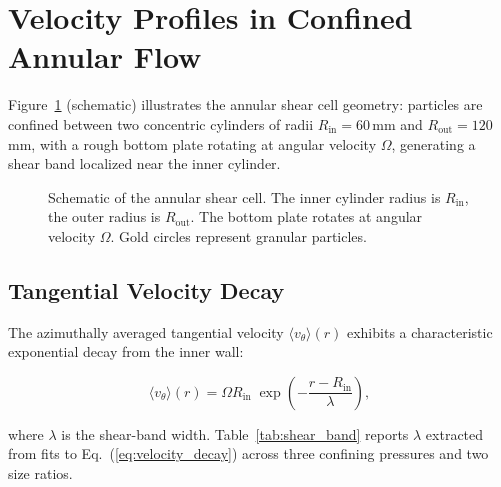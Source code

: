 \section{Velocity Profiles in Confined Annular Flow}

Figure~\ref{fig:velocity_schematic} (schematic) illustrates the annular shear cell geometry: particles are confined between two concentric cylinders of radii $R_{\text{in}} = 60$\,mm and $R_{\text{out}} = 120$\,mm, with a rough bottom plate rotating at angular velocity $\Omega$, generating a shear band localized near the inner cylinder.

\begin{figure}[htbp]
\centering
{}
\caption{Schematic of the annular shear cell. The inner cylinder radius is $R_{\text{in}}$, the outer radius is $R_{\text{out}}$. The bottom plate rotates at angular velocity $\Omega$. Gold circles represent granular particles.}
\label{fig:velocity_schematic}
\end{figure}

\subsection*{Tangential Velocity Decay}

The azimuthally averaged tangential velocity $\langle v_\theta\rangle(r)$ exhibits a characteristic exponential decay from the inner wall:

\begin{equation}\label{eq:velocity_decay}
\langle v_\theta\rangle(r) = \Omega R_{\text{in}}\;
\exp\!\left(-\frac{r - R_{\text{in}}}{\lambda}\right),
\end{equation}

where $\lambda$ is the shear-band width. Table~\ref{tab:shear_band} reports $\lambda$ extracted from fits to Eq.~(\ref{eq:velocity_decay}) across three confining pressures and two size ratios.

